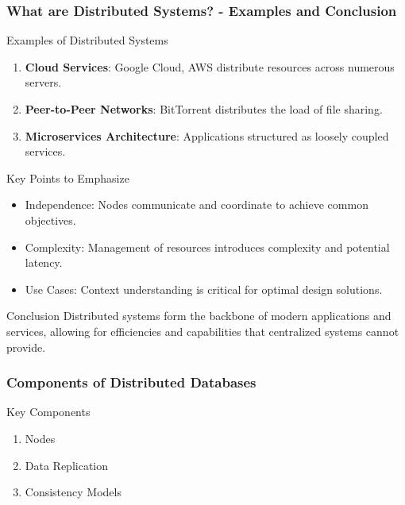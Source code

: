 \documentclass[aspectratio=169]{beamer}
\begin{document}
\begin{frame}[fragile]
    \frametitle{What are Distributed Systems? - Examples and Conclusion}
    \begin{block}{Examples of Distributed Systems}
        \begin{enumerate}
            \item \textbf{Cloud Services}: Google Cloud, AWS distribute resources across numerous servers.
            \item \textbf{Peer-to-Peer Networks}: BitTorrent distributes the load of file sharing.
            \item \textbf{Microservices Architecture}: Applications structured as loosely coupled services.
        \end{enumerate}
    \end{block}

    \begin{block}{Key Points to Emphasize}
        \begin{itemize}
            \item Independence: Nodes communicate and coordinate to achieve common objectives.
            \item Complexity: Management of resources introduces complexity and potential latency.
            \item Use Cases: Context understanding is critical for optimal design solutions.
        \end{itemize}
    \end{block}

    \begin{block}{Conclusion}
        Distributed systems form the backbone of modern applications and services, allowing for efficiencies and capabilities that centralized systems cannot provide.
    \end{block}
\end{frame}

\begin{frame}[fragile]
  \frametitle{Components of Distributed Databases}
  \begin{block}{Key Components}
    \begin{enumerate}
      \item Nodes
      \item Data Replication
      \item Consistency Models
    \end{enumerate}
  \end{block}
\end{frame}
\end{document}
